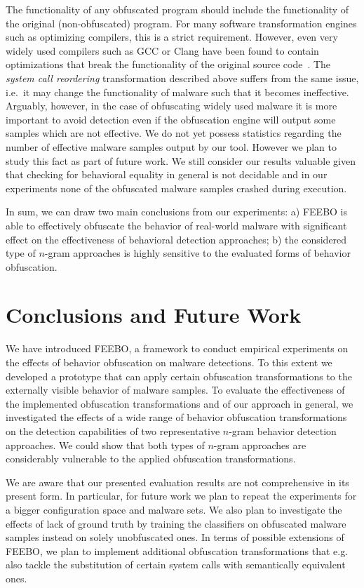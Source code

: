 \documentclass{llncs}
\begin{document}
The functionality of any obfuscated program should include the functionality of the original (non-obfuscated) program. For many software transformation engines such as optimizing compilers, this is a strict requirement. However, even very widely used compilers such as GCC or Clang have been found to contain optimizations that break the functionality of the original source code~\cite{Yang2011}. The \emph{system call reordering} transformation described above suffers from the same issue, i.e.~it may change the functionality of malware such that it becomes ineffective. 
Arguably, however, in the case of obfuscating widely used malware it is more important to avoid detection even if the obfuscation engine will output some samples which are not effective. We do not yet possess statistics regarding the number of effective malware samples output by our tool. However we plan to study this fact as part of future work. We still consider our results valuable given that checking for behavioral equality in general is not decidable and in our experiments none of the obfuscated malware samples crashed during execution.

In sum, we can draw two main conclusions from our experiments: a) FEEBO is able to effectively obfuscate the behavior of real-world malware with significant effect on the effectiveness of behavioral detection approaches; b) the considered type of $n$-gram approaches is highly sensitive to the evaluated forms of behavior obfuscation.
 
\section{Conclusions and Future Work}
\label{sec:conclusion}

We have introduced FEEBO, a framework to conduct empirical experiments on the effects of behavior obfuscation on malware detections. To this extent we developed a prototype that can apply certain obfuscation transformations to the externally visible behavior of malware samples. 
To evaluate the effectiveness of the implemented obfuscation transformations and of our approach in general, we investigated the effects of a wide range of behavior obfuscation transformations on the detection capabilities of two representative $n$-gram behavior detection approaches. 
We could show that both types of $n$-gram approaches are considerably vulnerable to the applied obfuscation transformations. 

We are aware that our presented evaluation results are not comprehensive 
in its present form. In particular, for future work we plan to repeat the experiments for a bigger configuration space and malware sets. We also plan to investigate the effects of lack of ground truth by training the classifiers on obfuscated malware samples instead on solely unobfuscated ones. 
In terms of possible extensions of FEEBO, we plan to implement additional obfuscation transformations that e.g. also tackle the substitution of certain system calls with semantically equivalent ones. 
\end{document}
